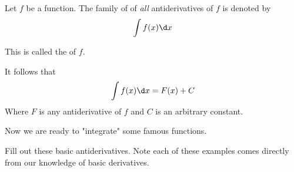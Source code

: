 \documentclass{ximera}
\begin{document}
\begin{definition}
Let $f$ be a function. The family of of \emph{all} antiderivatives of $f$ is denoted by
\[
\int f(x) \d x 
\]

This is called the
 of $f$.
\end{definition}
It follows that
\[
\int f(x) \d x =F(x)+C
\]
Where $F$ is any antiderivative of $f$ and $C$ is an arbitrary constant.

Now we are ready to "integrate" some famous functions.


Fill out these basic antiderivatives. Note each of these examples comes
directly from our knowledge of basic derivatives.

\end{document}
